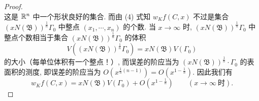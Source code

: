 \begin{proof}
\begin{equation}
\end{equation}
这是 $\mathbb{R}^n$ 中一个形状良好的集合. 而由 (4) 式知 $w_Kf(C,x)$ 不过是集合 $(xN(\mathfrak{B}))^{\frac{1}{n}}\Gamma_0$ 中整点 $(x_1,\cdots,x_n)$ 的个数. 当 $x\to\infty$ 时, $(xN(\mathfrak{B}))^{\frac{1}{n}}\Gamma_0$ 中整点个数相当于集合 $(xN(\mathfrak{B}))^{\frac{1}{n}}\Gamma_0$ 的体积
\[
  V((xN(\mathfrak{B}))^{\frac{1}{n}}\Gamma_0)=xN(\mathfrak{B})V(\Gamma_0)
\]
的大小（每单位体积有一个整点！）, 而误差的阶应当为 $(xN(\mathfrak{B}))^{\frac{1}{n}}\cdot\Gamma_0$ 的表面积的测度, 即误差的阶应当为 $O(x^{\frac{1}{n}(n-1)})=O(x^{1-\frac{1}{n}})$. 因此我们有
\begin{equation}\tag{6}
  w_Kf(C,x)=xN(\mathfrak{B})V(\Gamma_0)+O\left(x^{1-\frac{1}{n}}\right)\qquad(x\to\infty\ \text{时}).
\end{equation}


\end{proof}
